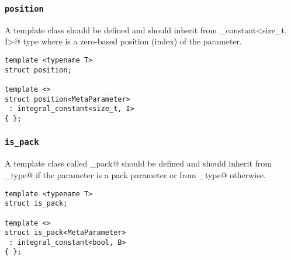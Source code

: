 \subsubsection{\texttt{position}}

A template class \verb@position@ should be defined and should
inherit from \verb@integral_constant<size_t, I>@ type where \verb@I@ is
a zero-based position (index) of the parameter.

\begin{verbatim}
template <typename T>
struct position;

template <>
struct position<MetaParameter>
 : integral_constant<size_t, I>
{ };
\end{verbatim}

\subsubsection{\texttt{is\_pack}}

A template class called \verb@is_pack@ should be defined and should
inherit from \verb@true_type@ if the parameter is a pack
parameter or from \verb@false_type@ otherwise.

\begin{verbatim}
template <typename T>
struct is_pack;

template <>
struct is_pack<MetaParameter>
 : integral_constant<bool, B>
{ };
\end{verbatim}

